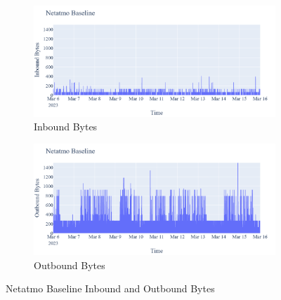\begin{figure}[H]
    \centering
    \begin{subfigure}[b]{0.7\textwidth}
        \includegraphics[width=\textwidth]{figures/Netatmo_Baseline_InboundBytes.png}
        \caption{Inbound Bytes}
        \label{fig:NetatmoBaselineInboundBytes}
    \end{subfigure}
    \begin{subfigure}[b]{0.7\textwidth}
        \includegraphics[width=\textwidth]{figures/Netatmo_Baseline_OutboundBytes.png}
        \caption{Outbound Bytes}
        \label{fig:NetatmoBaselineOutboundBytes}
    \end{subfigure}
    \caption{Netatmo Baseline Inbound and Outbound Bytes}
    \label{Fig:NetatmoBaselineOutandInboundBytes}
 \end{figure}

